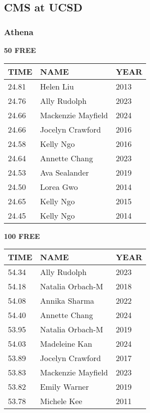 \vspace{0.4cm}

\newpage

\subsection{CMS at UCSD}
\subsubsection{Athena}

\begin{minipage}[t]{0.48\textwidth}
\centering
\textbf{50 FREE}\\[0.05cm]
\begin{tabular}{@{}p{1.8cm}p{2.8cm}p{1.2cm}@{}}
\hline
\textbf{TIME} & \textbf{NAME} & \textbf{YEAR} \\
\hline
24.81 & Helen Liu & 2013 \\
24.76 & Ally Rudolph & 2023 \\
24.66 & Mackenzie Mayfield & 2024 \\
24.66 & Jocelyn Crawford & 2016 \\
24.58 & Kelly Ngo & 2016 \\
24.64 & Annette Chang & 2023 \\
24.53 & Ava Sealander & 2019 \\
24.50 & Lorea Gwo & 2014 \\
24.65 & Kelly Ngo & 2015 \\
24.45 & Kelly Ngo & 2014 \\
\hline
\end{tabular}
\end{minipage}\hfill
\begin{minipage}[t]{0.48\textwidth}
\centering
\textbf{100 FREE}\\[0.05cm]
\begin{tabular}{@{}p{1.8cm}p{2.8cm}p{1.2cm}@{}}
\hline
\textbf{TIME} & \textbf{NAME} & \textbf{YEAR} \\
\hline
54.34 & Ally Rudolph & 2023 \\
54.18 & Natalia Orbach-M & 2018 \\
54.08 & Annika Sharma & 2022 \\
54.40 & Annette Chang & 2024 \\
53.95 & Natalia Orbach-M & 2019 \\
54.03 & Madeleine Kan & 2024 \\
53.89 & Jocelyn Crawford & 2017 \\
53.83 & Mackenzie Mayfield & 2023 \\
53.82 & Emily Warner & 2019 \\
53.78 & Michele Kee & 2011 \\
\hline
\end{tabular}
\end{minipage}

